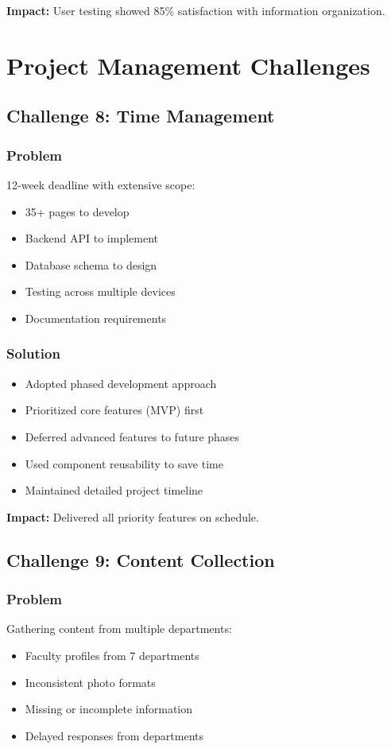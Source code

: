 \documentclass[12pt,a4paper]{report}
\begin{document}
\textbf{Impact:} User testing showed 85\% satisfaction with information organization.

\section{Project Management Challenges}

\subsection{Challenge 8: Time Management}

\subsubsection*{Problem}
12-week deadline with extensive scope:
\begin{itemize}
    \item 35+ pages to develop
    \item Backend API to implement
    \item Database schema to design
    \item Testing across multiple devices
    \item Documentation requirements
\end{itemize}

\subsubsection*{Solution}
\begin{itemize}
    \item Adopted phased development approach
    \item Prioritized core features (MVP) first
    \item Deferred advanced features to future phases
    \item Used component reusability to save time
    \item Maintained detailed project timeline
\end{itemize}

\textbf{Impact:} Delivered all priority features on schedule.

\subsection{Challenge 9: Content Collection}

\subsubsection*{Problem}
Gathering content from multiple departments:
\begin{itemize}
    \item Faculty profiles from 7 departments
    \item Inconsistent photo formats
    \item Missing or incomplete information
    \item Delayed responses from departments
\end{itemize}
\end{document}
